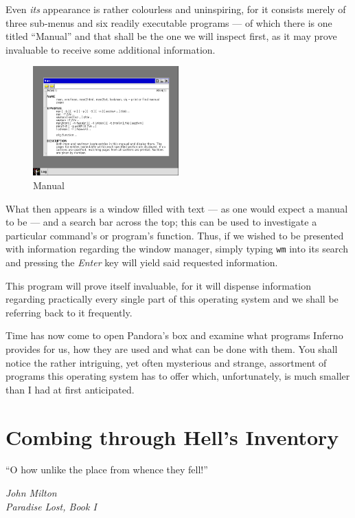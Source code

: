 \documentclass[a5paper,twoside,12pt]{report}
\begin{document}
	Even \textit{its} appearance is rather colourless and uninspiring, for it consists merely of three sub-menus and six readily executable programs — of which there is one titled ``Manual'' and that shall be the one we will inspect first, as it may prove invaluable to receive some additional information.

  \begin{figure}
    \centering
    \includegraphics[width=0.5\textwidth]{imgs/manual.png}
    \caption{Manual}
  \end{figure}

  What then appears is a window filled with text — as one would expect a manual to be — and a search bar across the top; this can be used to investigate a particular command's or program's function. Thus, if we wished to be presented with information regarding the window manager, simply typing \texttt{wm} into its search and pressing the \textit{Enter} key will yield said requested information.

  This program will prove itself invaluable, for it will dispense information regarding practically every single part of this operating system and we shall be referring back to it frequently.

  Time has now come to open Pandora's box and examine what programs Inferno provides for us, how they are used and what can be done with them. You shall notice the rather intriguing, yet often mysterious and strange, assortment of programs this operating system has to offer which, unfortunately, is much smaller than I had at first anticipated.\newpage

  \chapter*{Combing through Hell's Inventory}

  \epigraph{``O how unlike the place from whence they fell!''}{\textit{John Milton\\Paradise Lost, Book I}}
\end{document}
